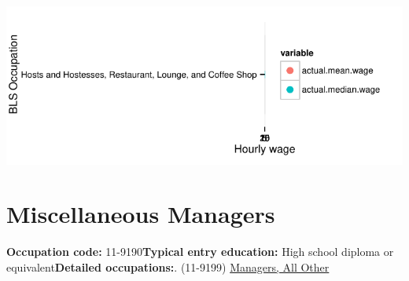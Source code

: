 \documentclass[a4paper,10pt]{article}\usepackage[]{graphicx}\usepackage[]{color}
\makeatletter
\def\maxwidth{ %
  \ifdim\Gin@nat@width>\linewidth
    \linewidth
  \else
    \Gin@nat@width
  \fi
}
\makeatother
\begin{document}
{\centering \includegraphics[width=\maxwidth]{figure/unnamed-chunk-294} 

}


\newpage\section{Miscellaneous Managers}\textbf{Occupation code:} 11-9190\newline\textbf{Typical entry education:} High school diploma or equivalent\newline\textbf{Detailed occupations:}. (11-9199)  \href{http://www.bls.gov/oes/current/oes119199.htm}{Managers, All Other}\newline%
\end{document}
